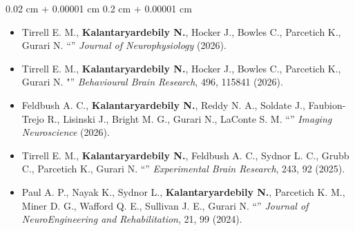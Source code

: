 \documentclass[10pt, letterpaper]{article}
\newenvironment{highlights}{
    \begin{itemize}[
        topsep=0.10 cm,
        parsep=0.10 cm,
        partopsep=0pt,
        itemsep=0pt,
        leftmargin=0.2 cm + 10pt
    ]
}{
    \end{itemize}
} %
\newenvironment{onecolentry}{
    \begin{adjustwidth}{
        0.02 cm + 0.00001 cm
    }{
        0.2 cm + 0.00001 cm
    }
}{
    \end{adjustwidth}
} %
\let\hrefWithoutArrow\href
\renewcommand{\href}[2]{\hrefWithoutArrow{#1}{#2}}
\begin{document}
\begin{onecolentry}
\begin{highlights}
\textbf{------------------------------------------------------------------ Co-Author Journal Articles ------------------------------------------------------------------}\\
\vspace{-1.em}
\item Tirrell E. M., \textbf{Kalantaryardebily N.}, Hocker J., Bowles C., Parcetich K., Gurari N. ``{\href{https://journals.physiology.org/doi/abs/10.1152/jn.00276.2025}{\color{black}{Perceiving Auditory Stimuli Impacts Conscious Perception of Electrotactile Stimuli in Older Adults}}}'' \textit{Journal of Neurophysiology} (2026).

    \item Tirrell E. M., \textbf{Kalantaryardebily N.}, Hocker J., Bowles C., Parcetich K., Gurari N. "{\href{https://www.sciencedirect.com/science/article/abs/pii/S0166432825004280}{\color{black}{Impact of an Auditory Cognitive Load on Consciously Perceiving Electrotactile Stimuli in Young Adults}}}'' \textit{Behavioural Brain Research}, 496, 115841 (2026).

    \item Feldbush A. C., \textbf{Kalantaryardebily N.}, Reddy N. A., Soldate J., Faubion-Trejo R., Lisinski J., Bright M. G., Gurari N., LaConte S. M. ``{\href{https://direct.mit.edu/imag/article/doi/10.1162/IMAG.a.1236/136459/Tactile-Force-Evokes-a-Biphasic-BOLD-Response-in}{\color{black}{Tactile Pressure Evokes a Biphasic BOLD Response in Ipsilateral Primary Somatosensory Cortex}}}'' \textit{Imaging Neuroscience} (2026).
    

    \item Tirrell E. M., \textbf{Kalantaryardebily N.}, Feldbush A. C., Sydnor L. C., Grubb C., Parcetich K., Gurari N. ``{\href{https://link.springer.com/article/10.1007/s00221-025-07044-5}{\color{black}{Considerations for Tactile Perceptual Assessments: Impact of Arm Dominance, Nerve, Location, and Sex in Young and Older Adults}}}'' \textit{Experimental Brain Research}, 243, 92 (2025).
    
    \item Paul A. P., Nayak K., Sydnor L., \textbf{Kalantaryardebily N.}, Parcetich K. M., Miner D. G., Wafford Q. E., Sullivan J. E., Gurari N. ``{\href{https://jneuroengrehab.biomedcentral.com/articles/10.1186/s12984-024-01397-8}{\color{black}{A Scoping Review on Examination Approaches for Identifying Tactile Deficits at the Upper Extremity in Individuals with Stroke}}}'' \textit{Journal of NeuroEngineering and Rehabilitation}, 21, 99 (2024).


\end{highlights}
\end{onecolentry}
\end{document}
